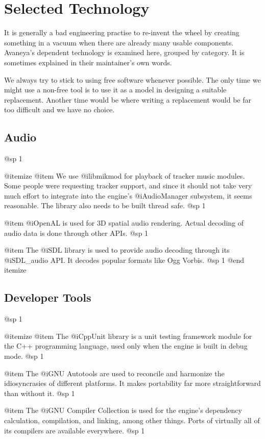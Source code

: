 \chapter{Selected Technology}
It is generally a bad engineering practise to re-invent the wheel by creating something in a vacuum when there are already many usable components. Avaneya's dependent technology is examined here, grouped by category. It is sometimes explained in their maintainer's own words.

We always try to stick to using free software whenever possible. The only time we might use a non-free tool is to use it as a model in designing a suitable replacement. Another time would be where writing a replacement would be far too difficult and we have no choice.

\section{Audio}
@sp 1

@itemize
@item
We use @i{libmikmod} for playback of tracker music modules. Some people were requesting tracker support, and since it should not take very much effort to integrate into the engine's @i{AudioManager} subsystem, it seems reasonable. The library also needs to be built thread safe.
@sp 1

@item
@i{OpenAL} is used for 3D spatial audio rendering. Actual decoding of audio data is done through other APIs.
@sp 1

@item
The @i{SDL} library is used to provide audio decoding through its @i{SDL_audio} API. It decodes popular formats like Ogg Vorbis.
@sp 1
@end itemize

\section{Developer Tools}
@sp 1

@itemize
@item
The @i{CppUnit} library is a unit testing framework module for the C++ programming language, used only when the engine is built in debug mode.
@sp 1

@item
The @i{GNU Autotools} are used to reconcile and harmonize the idiosyncrasies of different platforms. It makes portability far more straightforward than without it.
@sp 1

@item
The @i{GNU Compiler Collection} is used for the engine's dependency calculation, compilation, and linking, among other things. Ports of virtually all of its compilers are available everywhere.
@sp 1

